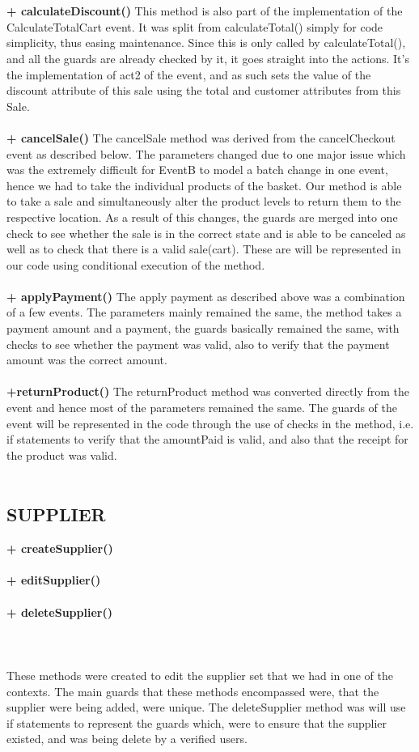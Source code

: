\documentclass[a4paper]{article}
\begin{document}
\\\\
{\bf + calculateDiscount()}
This method is also part of the implementation of the CalculateTotalCart event. It was split from calculateTotal() simply for code simplicity, thus easing maintenance. Since this is only called by calculateTotal(), and all the guards are already checked by it, it goes straight into the actions. It’s the implementation of act2 of the event, and as such sets the value of the discount attribute of this sale using the total and customer attributes from this Sale.
\\\\
{\bf + cancelSale()}
The cancelSale method was derived from the cancelCheckout event as described below. The parameters changed due to one major issue which was the extremely difficult for EventB to model a batch change in one event, hence we had to take the individual products of the basket. Our method is able to take a sale and simultaneously alter the product levels to return them to the respective location. As a result of this changes, the guards are merged into one check to see whether the sale is in the correct state and is able to be canceled as well as to check that there is a valid sale(cart). These are will be represented in our code using conditional execution of the method. 
\\\\
{\bf + applyPayment()}
The apply payment as described above was a combination of a few events. The parameters mainly remained the same, the method takes a payment amount and a payment, the guards basically remained the same, with checks to see whether the  payment was valid, also to verify that the payment amount was the correct amount. 
\\\\
{\bf +returnProduct()}
The returnProduct method was converted directly from the event and hence most of the parameters remained the same. The guards of the  event will be represented in the code through the use of checks in the method, i.e. if statements to verify that the amountPaid is valid, and also that the receipt for the product was valid.
\\\\
\subsection{SUPPLIER}
{\bf + createSupplier()}\\\\
{\bf + editSupplier()}\\\\
{\bf + deleteSupplier()}\\\\
\\\\
These methods were created to edit the supplier set that we had in one of the contexts. The main guards that these methods encompassed were, that the supplier were being added, were unique. The deleteSupplier method was will use if statements to represent the guards which, were to ensure that the supplier existed, and was being delete by a verified users. 
\\\\
\end{document}
